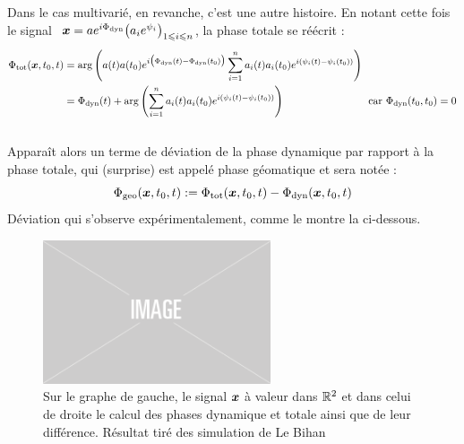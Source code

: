 Dans le cas multivarié, en revanche, c'est une autre histoire. En notant cette fois le signal $\ \boldsymbol{x} = ae^{i\Phi_{\text{\normalfont dyn}}} \big( a_ie^{\psi_i} \big)_{1\leqslant i\leqslant n}$, la phase totale se réécrit :
\begin{equation}\label{eq:diff_phases_t/d}
	\begin{aligned}
		\Phi_{\text{\normalfont tot}}(\boldsymbol{x},t_0, t) &= \arg \left(a(t)a(t_0) e^{i\big(\Phi_{\text{\normalfont dyn}}(t) - \Phi_{\text{\normalfont dyn}}(t_0)\big)}\sum_{i=1}^n a_i(t)a_i(t_0)e^{i(\psi_i(t)-\psi_i(t_0))} \right) \\
		&= \Phi_{\text{\normalfont dyn}}(t) + \arg \left(\sum_{i=1}^n a_i(t)a_i(t_0)e^{i(\psi_i(t)-\psi_i(t_0))} \right)  \qquad\qquad\qquad\qquad \text{car } \Phi_{\text{\normalfont dyn}}(t_0,t_0) = 0
	\end{aligned}
\end{equation}
\\
Apparaît alors un terme de déviation de la phase dynamique par rapport à la phase totale, qui (surprise) est appelé phase géomatique et sera notée :
\begin{equation}\label{eq:phase_g}
	\Phi_{\text{\normalfont geo}}(\boldsymbol{x},t_0,t) := \Phi_{\text{\normalfont tot}}(\boldsymbol{x}, t_0,t) - \Phi_{\text{\normalfont dyn}}(\boldsymbol{x}, t_0,t)
\end{equation}
Déviation qui s'observe expérimentalement, comme le montre la  ci-dessous.
\\
\begin{figure}[h]
	\includegraphics[width=0.6\textwidth]{fig/placeholder}
	\caption[Déviation de la phase dynamique par rapport à la phase totale]{Sur le graphe de gauche, le signal $\boldsymbol{x}$ à valeur dans $\mathbb{R}^2$ et dans celui de droite le calcul des phases dynamique et totale ainsi que de leur différence. Résultat tiré des simulation de Le Bihan \etal~\cite{le_bihan_modephysiques_2023}}
	\label{fig:calc_diff_phases}
\end{figure}
\\

